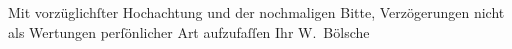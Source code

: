 \pstart
           Mit vorzüglichſter Hochachtung und der nochmaligen Bitte, Verzögerungen nicht als
               Wertungen perſönlicher Art aufzufaſſen\pend
           \pstart Ihr \spacefill\mbox{W. Bölsche}\pend{}\endnumbering{}  
      